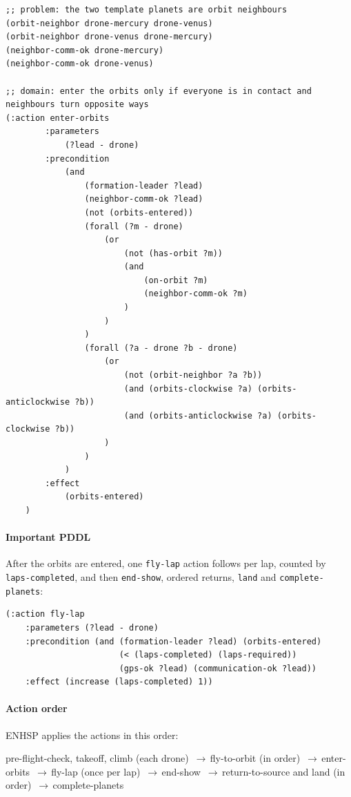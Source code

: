 \documentclass[11pt,a4paper,oneside]{report}
\newcommand{\code}[1]{\texttt{#1}}
\newcommand{\then}{\,{\color{amber!80!black}$\boldsymbol{\rightarrow}$}\allowbreak\,}
\newcommand{\actionflow}[1]{%
  \par\begin{tcolorbox}[colback=codebg,colframe=coderule,boxrule=0.4pt,arc=2pt,
      left=5pt,right=5pt,top=2pt,bottom=2pt,before skip=6pt,after skip=8pt]
    \footnotesize\ttfamily\raggedright\setstretch{1.25}#1
  \end{tcolorbox}}
\begin{document}
\begin{lstlisting}
;; problem: the two template planets are orbit neighbours
(orbit-neighbor drone-mercury drone-venus)
(orbit-neighbor drone-venus drone-mercury)
(neighbor-comm-ok drone-mercury)
(neighbor-comm-ok drone-venus)

;; domain: enter the orbits only if everyone is in contact and neighbours turn opposite ways
(:action enter-orbits
        :parameters
            (?lead - drone)
        :precondition
            (and
                (formation-leader ?lead)
                (neighbor-comm-ok ?lead)
                (not (orbits-entered))
                (forall (?m - drone)
                    (or
                        (not (has-orbit ?m))
                        (and
                            (on-orbit ?m)
                            (neighbor-comm-ok ?m)
                        )
                    )
                )
                (forall (?a - drone ?b - drone)
                    (or
                        (not (orbit-neighbor ?a ?b))
                        (and (orbits-clockwise ?a) (orbits-anticlockwise ?b))
                        (and (orbits-anticlockwise ?a) (orbits-clockwise ?b))
                    )
                )
            )
        :effect
            (orbits-entered)
    )
\end{lstlisting}

\paragraph{Important PDDL}
After the orbits are entered, one \code{fly-lap} action follows per lap, counted by
\code{laps-completed}, and then \code{end-show}, ordered returns, \code{land} and \code{complete-planets}:

\begin{lstlisting}
(:action fly-lap
    :parameters (?lead - drone)
    :precondition (and (formation-leader ?lead) (orbits-entered)
                       (< (laps-completed) (laps-required))
                       (gps-ok ?lead) (communication-ok ?lead))
    :effect (increase (laps-completed) 1))
\end{lstlisting}

\paragraph{Action order} ENHSP applies the actions in this order:
\actionflow{pre-flight-check, takeoff, climb (each drone) \then fly-to-orbit (in order) \then enter-orbits \then fly-lap (once
per lap) \then end-show \then return-to-source and land (in order) \then complete-planets}
\end{document}
